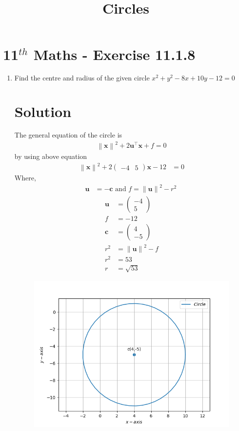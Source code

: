 \documentclass[12pt]{article}
\providecommand{\norm}[1]{\left\lVert#1\right\rVert}
\newcommand{\myvec}[1]{\ensuremath{\begin{pmatrix}#1\end{pmatrix}}}
\let\vec\mathbf
\begin{document}
\begin{center}
\title{\textbf{Circles}}
\date{\vspace{-5ex}} %
\maketitle
\end{center}
\setcounter{page}{1}
\section{11$^{th}$ Maths - Exercise 11.1.8}

\begin{enumerate}
\item Find the centre and radius of the given circle $x^2+y^2-8x+10y-12=0$
\section{Solution}
The general equation of  the circle is 
\begin{align}
\norm{\vec{x}}^{2} + 2\vec{u}^{\top}\vec{x} + f = 0
\end{align}
by using above equation
\begin{align}
	\norm{\vec{x}}^2+2\myvec{-4 & 5}\vec{x}-12&=0
\end{align}	
Where,
\begin{align}
	\vec{u} &= -\vec{c} \text{ and } f = \norm{\vec{u}}^{2} - r^{2}\
\end{align}
\begin{align}
 \vec{u}&=\myvec{-4\\5}\\
 f&=-12\\
\vec{c}&=\myvec{4 \\ -5}\\
r^2&=\norm{\vec{u}}^2-f\\
r^2&= 53\\
r&=\sqrt{53}
\end{align}
\begin{figure}[!h]
	\begin{center} 
	   \includegraphics[width=\columnwidth]{figs/11.1.8.png}
	\end{center}
\caption{}
\label{fig:Fig1}
\end{figure}
\end{enumerate}
\end{document}
